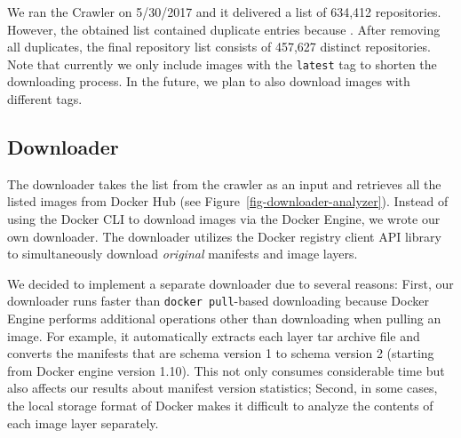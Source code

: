


We ran the Crawler on 5/30/2017 and it delivered a list of 634,412 repositories.
%
However, the obtained list contained duplicate entries because .
%
After removing all duplicates, the final repository list consists of 457,627
distinct repositories. 
%
Note that currently we only include images with the \texttt{latest} tag to
shorten the downloading process. 
%
In the future, we plan to also download images with different tags.
%
%
%

\subsection{Downloader}
\label{sec:downloader}

The downloader takes the list from the crawler as an input and retrieves
all the listed images from Docker Hub (see Figure~\ref{fig-downloader-analyzer}).
%
Instead of using the Docker CLI to download images via the Docker Engine,
we wrote our own downloader. The downloader utilizes the Docker registry client API
library~\cite{docker-registry-library} to simultaneously
download \emph{original} manifests and image layers. 
%
%
%

We decided to implement a separate downloader due to several reasons:
%
First, our downloader runs faster than \texttt{docker pull}-based downloading because
Docker Engine performs additional operations other than downloading when
pulling an image.
%
For example, it automatically extracts each layer tar archive file
and converts the manifests that are schema version 1 to schema version 2
(starting from Docker engine version 1.10). This
not only consumes considerable time but also affects
our results about manifest version statistics;
%
Second, in some cases, the local storage format of Docker makes it difficult
to analyze the contents of each image layer separately.
%
%

